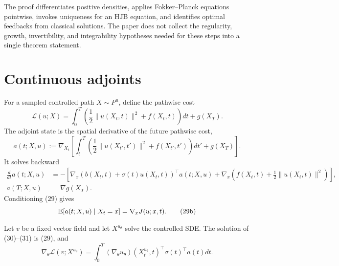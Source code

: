 \begin{remark}
The proof differentiates positive densities, applies Fokker--Planck equations pointwise, invokes uniqueness for an HJB equation, and identifies optimal feedbacks from classical solutions.  The paper does not collect the regularity, growth, invertibility, and integrability hypotheses needed for these steps into a single theorem statement.
\end{remark}

\section{Continuous adjoints}

For a sampled controlled path $X\sim P^u$, define the pathwise cost
\begin{equation*}
 \mathcal L(u;X)
 =\int_0^T\left(\frac12\|u(X_t,t)\|^2+f(X_t,t)\right)dt+g(X_T).
 \tag{28}
\end{equation*}
The adjoint state is the spatial derivative of the future pathwise cost,
\begin{equation*}
 a(t;X,u)
 :=\nabla_{X_t}\left[
 \int_t^T\left(\frac12\|u(X_{t'},t')\|^2+f(X_{t'},t')\right)dt'
 +g(X_T)
 \right].
 \tag{29}
\end{equation*}
It solves backward
\begin{align*}
 \frac d{dt}a(t;X,u)
 &=-\left[
 \nabla_x(b(X_t,t)+\sigma(t)u(X_t,t))^\top a(t;X,u)
 +\nabla_x\left(f(X_t,t)+\frac12\|u(X_t,t)\|^2\right)
 \right],
 \tag{30}\\
 a(T;X,u)&=\nabla g(X_T).
 \tag{31}
\end{align*}
Conditioning (29) gives
\begin{equation*}
 \mathbb{E}[a(t;X,u)\mid X_t=x]=\nabla_xJ(u;x,t).
 \tag{29b}
\end{equation*}

\begin{lemma}
Let $v$ be a fixed vector field and let $X^{u_\theta}$ solve the controlled SDE.  The solution of (30)--(31) is (29), and
\begin{equation*}
 \nabla_\theta\mathcal L(v;X^{u_\theta})
 =\int_0^T
 (\nabla_\theta u_\theta)(X_t^{u_\theta},t)^\top
 \sigma(t)^\top a(t)dt.
 \tag{185}
\end{equation*}
\end{lemma}

